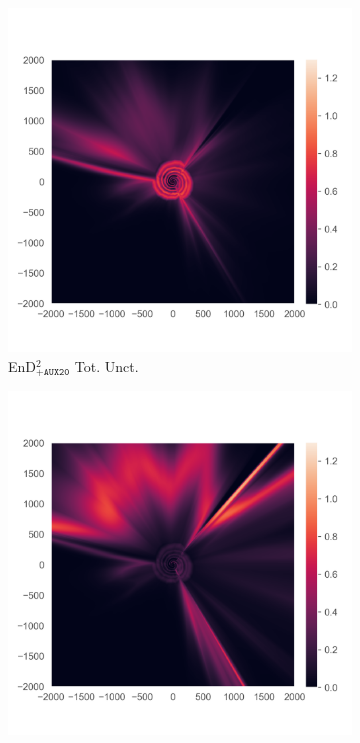 \begin{figure}
\begin{subfigure}{0.22\textwidth}
  \centering
  \includegraphics[trim=42 45 15 55, clip, width=\linewidth]{plots/3q.png}
  \caption{EnD$^2_{\texttt{+AUX20}}$ Tot. Unct.}
  \label{fig:3p}
\end{subfigure}%
\begin{subfigure}{0.22\textwidth}
  \centering
  \includegraphics[trim=42 45 15 55, clip, width=\linewidth]{plots/3r.png}

\end{subfigure}
\end{figure}
